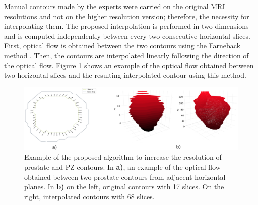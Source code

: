 Manual contours made by the experts were carried on the original MRI resolutions and not on the higher resolution version; therefore, the necessity for interpolating them.  The proposed interpolation is performed in two dimensions and is computed independently between every two consecutive horizontal slices. First, optical flow is obtained between the two contours using the Farneback method \cite{optflow}. Then, the contours are interpolated linearly following the direction of the optical flow. Figure \ref{fig:of1} shows an example of the optical flow obtained between two horizontal slices and the resulting interpolated contour using this method. 

\begin{figure}[h]
    \centering
    \includegraphics[totalheight=.21\textheight]{figures/Figure2.eps}
    \caption{Example of the proposed algorithm to increase the resolution of prostate and PZ contours. In \textbf{a)}, an example of the optical flow obtained between two prostate contours from adjacent horizontal planes. In \textbf{b)} on the left, original contours with 17 slices. On the right, interpolated contours with 68 slices.}
    \label{fig:of1}
\end{figure}

